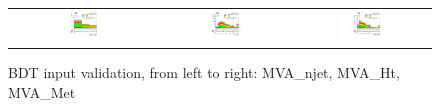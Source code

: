 \begin{figure}[tbh!]
 \begin{center}
 \begin{tabular}{ccc}
  \includegraphics[width=0.325\textwidth]{figures/Part3/BDT/njet}&
    \includegraphics[width=0.325\textwidth]{figures/Part3/BDT/Ht}&
  \includegraphics[width=0.325\textwidth]{figures/Part3/BDT/Met}\\
 \end{tabular}
 \caption{BDT input validation, from left to right: MVA\_njet, MVA\_Ht, MVA\_Met}
 \label{fig:input_vali_4}
 \end{center}
\end{figure}



